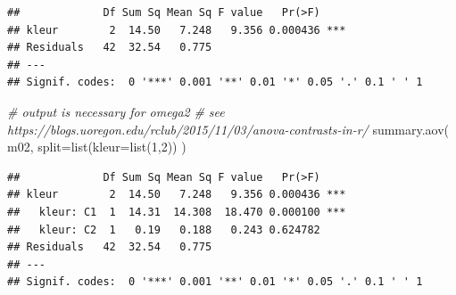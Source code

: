 \documentclass[
]{book}
\newenvironment{Shaded}{\begin{snugshade}}{\end{snugshade}}
\newcommand{\AttributeTok}[1]{\textcolor[rgb]{0.77,0.63,0.00}{#1}}
\newcommand{\CommentTok}[1]{\textcolor[rgb]{0.56,0.35,0.01}{\textit{#1}}}
\newcommand{\DecValTok}[1]{\textcolor[rgb]{0.00,0.00,0.81}{#1}}
\newcommand{\FunctionTok}[1]{\textcolor[rgb]{0.00,0.00,0.00}{#1}}
\newcommand{\NormalTok}[1]{#1}
\newcommand{\OtherTok}[1]{\textcolor[rgb]{0.56,0.35,0.01}{#1}}
\newcommand{\SpecialCharTok}[1]{\textcolor[rgb]{0.00,0.00,0.00}{#1}}
\newcommand{\StringTok}[1]{\textcolor[rgb]{0.31,0.60,0.02}{#1}}
\begin{document}
\begin{Shaded}
\end{Shaded}

\begin{verbatim}
##             Df Sum Sq Mean Sq F value   Pr(>F)    
## kleur        2  14.50   7.248   9.356 0.000436 ***
## Residuals   42  32.54   0.775                     
## ---
## Signif. codes:  0 '***' 0.001 '**' 0.01 '*' 0.05 '.' 0.1 ' ' 1
\end{verbatim}

\begin{Shaded}
\begin{Highlighting}[]
\CommentTok{\# output is necessary for omega2}
\CommentTok{\# see https://blogs.uoregon.edu/rclub/2015/11/03/anova{-}contrasts{-}in{-}r/}
\FunctionTok{summary.aov}\NormalTok{( m02, }\AttributeTok{split=}\FunctionTok{list}\NormalTok{(}\AttributeTok{kleur=}\FunctionTok{list}\NormalTok{(}\DecValTok{1}\NormalTok{,}\DecValTok{2}\NormalTok{)) )}
\end{Highlighting}
\end{Shaded}

\begin{verbatim}
##             Df Sum Sq Mean Sq F value   Pr(>F)    
## kleur        2  14.50   7.248   9.356 0.000436 ***
##   kleur: C1  1  14.31  14.308  18.470 0.000100 ***
##   kleur: C2  1   0.19   0.188   0.243 0.624782    
## Residuals   42  32.54   0.775                     
## ---
## Signif. codes:  0 '***' 0.001 '**' 0.01 '*' 0.05 '.' 0.1 ' ' 1
\end{verbatim}
\end{document}
